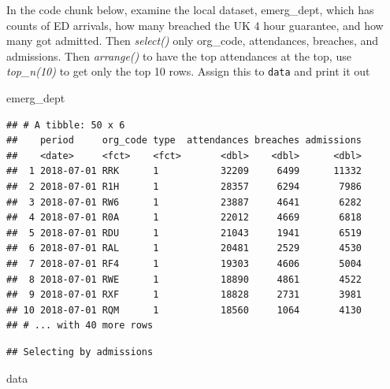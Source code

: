 \documentclass[
]{book}
\newenvironment{Shaded}{\begin{snugshade}}{\end{snugshade}}
\newcommand{\DecValTok}[1]{\textcolor[rgb]{0.00,0.00,0.81}{#1}}
\newcommand{\KeywordTok}[1]{\textcolor[rgb]{0.13,0.29,0.53}{\textbf{#1}}}
\newcommand{\NormalTok}[1]{#1}
\newcommand{\OperatorTok}[1]{\textcolor[rgb]{0.81,0.36,0.00}{\textbf{#1}}}
\newcommand{\StringTok}[1]{\textcolor[rgb]{0.31,0.60,0.02}{#1}}
\begin{document}
In the code chunk below, examine the local dataset, emerg\_dept,
which has counts of ED arrivals, how many breached the UK 4 hour guarantee, and how many got admitted.
Then \emph{select()} only org\_code, attendances, breaches, and admissions.
Then \emph{arrange()} to have the top attendances at the top,
use \emph{top\_n(10)} to get only the top 10 rows.
Assign this to \texttt{data} and print it out

\begin{Shaded}
\begin{Highlighting}[]
\NormalTok{emerg_dept}
\end{Highlighting}
\end{Shaded}

\begin{verbatim}
## # A tibble: 50 x 6
##    period     org_code type  attendances breaches admissions
##    <date>     <fct>    <fct>       <dbl>    <dbl>      <dbl>
##  1 2018-07-01 RRK      1           32209     6499      11332
##  2 2018-07-01 R1H      1           28357     6294       7986
##  3 2018-07-01 RW6      1           23887     4641       6282
##  4 2018-07-01 R0A      1           22012     4669       6818
##  5 2018-07-01 RDU      1           21043     1941       6519
##  6 2018-07-01 RAL      1           20481     2529       4530
##  7 2018-07-01 RF4      1           19303     4606       5004
##  8 2018-07-01 RWE      1           18890     4861       4522
##  9 2018-07-01 RXF      1           18828     2731       3981
## 10 2018-07-01 RQM      1           18560     1064       4130
## # ... with 40 more rows
\end{verbatim}

\begin{Shaded}
\end{Shaded}

\begin{verbatim}
## Selecting by admissions
\end{verbatim}

\begin{Shaded}
\begin{Highlighting}[]
\NormalTok{data}
\end{Highlighting}
\end{Shaded}
\end{document}

